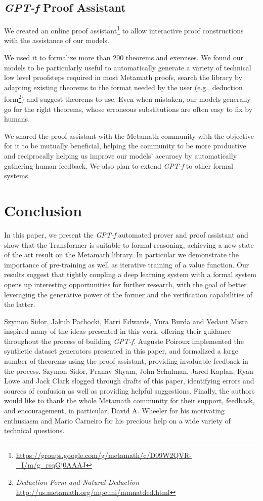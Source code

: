 \subsection{\textit{GPT-f} Proof Assistant}
\label{section:gptfproofassistant}

We created an online proof assistant\footnote{\url{https://groups.google.com/g/metamath/c/D09W2QVR-_I/m/g_rsqGj0AAAJ}} to allow interactive proof constructions with the assistance of our models.

We used it to formalize more than 200 theorems and exercises. We found our models to be particularly useful to automatically generate a variety of technical low level proofsteps required in most Metamath proofs, search the library by adapting existing theorems to the format needed by the user (e.g., deduction form\footnote{\textit{Deduction Form and Natural Deduction} \url{http://us.metamath.org/mpeuni/mmnatded.html}}) and suggest theorems to use. Even when mistaken, our models generally go for the right theorems, whose erroneous substitutions are often easy to fix by humans.

We shared the proof assistant with the Metamath community with the objective for it to be mutually beneficial, helping the community to be more productive and reciprocally helping us improve our models' accuracy by automatically gathering human feedback. We also plan to extend \textit{GPT-f} to other formal systems.

\section{Conclusion}

In this paper, we present the \textit{GPT-f} automated prover and proof assistant and show that the Transformer is suitable to formal reasoning, achieving a new state of the art result on the Metamath library. In particular we demonstrate the importance of pre-training as well as iterative training of a value function. Our results suggest that tightly coupling a deep learning system with a formal system opens up interesting opportunities for further research, with the goal of better leveraging the generative power of the former and the verification capabilities of the latter.

\begin{ack}
Szymon Sidor, Jakub Pachocki, Harri Edwards, Yura Burda and Vedant Misra inspired many of the ideas presented in this work, offering their guidance throughout the process of building \textit{GPT-f}. Auguste Poiroux implemented the synthetic dataset generators presented in this paper, and formalized a large number of theorems using the proof assistant, providing invaluable feedback in the process. Szymon Sidor, Pranav Shyam, John Schulman, Jared Kaplan, Ryan Lowe and Jack Clark slogged through drafts of this paper, identifying errors and sources of confusion as well as providing helpful suggestions. Finally, the authors would like to thank the whole Metamath community for their support, feedback, and encouragement, in particular, David A. Wheeler for his motivating enthusiasm and Mario Carneiro for his precious help on a wide variety of technical questions.
\end{ack}


